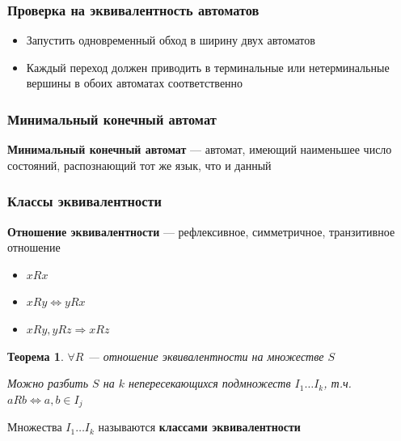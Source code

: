 \documentclass{beamer}
\newtheorem{rutheorem}{Теорема}
\def\iff{\Leftrightarrow}
\begin{document}
\begin{frame}[fragile]
  \transwipe[direction=90]
  \frametitle{Проверка на эквивалентность автоматов}
  \begin{itemize}
    \item Запустить одновременный обход в ширину двух автоматов
    \item Каждый переход должен приводить в терминальные или нетерминальные вершины в обоих автоматах соответственно
  \end{itemize}
\end{frame}

\begin{frame}[fragile]
  \transwipe[direction=90]
  \frametitle{Минимальный конечный автомат}
   \textbf{Минимальный конечный автомат} --- автомат, имеющий наименьшее число состояний, распознающий тот же язык, что и данный
\end{frame}

\begin{frame}[fragile]
  \transwipe[direction=90]
  \frametitle{Классы эквивалентности}
    \textbf{Отношение эквивалентности} --- рефлексивное, симметричное, транзитивное отношение
    \begin{itemize}
      \item $xRx$
      \item $xRy \iff yRx$
      \item $xRy, yRz \Rightarrow xRz$
    \end{itemize}
    
    \begin{rutheorem}
       $\forall R$ --- отношение эквивалентности на множестве $S$
      
      Можно разбить $S$ на $k$ непересекающихся подмножеств $I_1 \dots I_k$, т.ч. $aRb \iff a, b \in I_j$
    \end{rutheorem}
    

\begin{center}
      Множества $I_1 \dots I_k$ называются \textbf{классами эквивалентности}
\end{center}
\end{frame}
\end{document}
